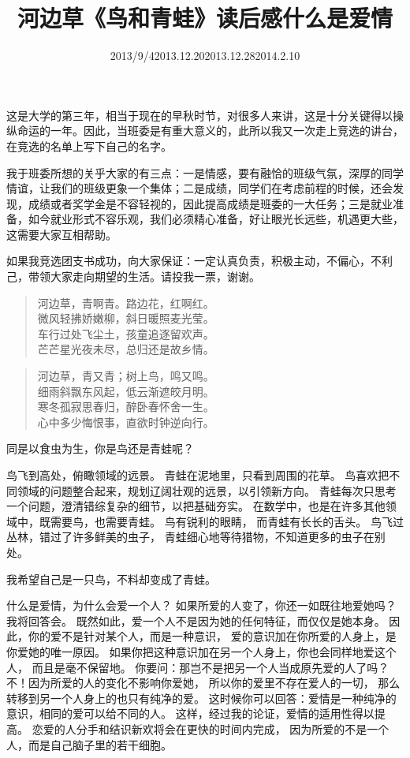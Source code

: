 \documentclass{article}
\begin{document}
这是大学的第三年，相当于现在的早秋时节，对很多人来讲，这是十分关键得以操纵命运的一年。因此，当班委是有重大意义的，此所以我又一次走上竞选的讲台，在竞选的名单上写下自己的名字。

我于班委所想的关乎大家的有三点：一是情感，要有融恰的班级气氛，深厚的同学情谊，让我们的班级更象一个集体；二是成绩，同学们在考虑前程的时候，还会发现，成绩或者奖学金是不容轻视的，因此提高成绩是班委的一大任务；三是就业准备，如今就业形式不容乐观，我们必须精心准备，好让眼光长远些，机遇更大些，这需要大家互相帮助。

如果我竞选团支书成功，向大家保证：一定认真负责，积极主动，不偏心，不利己，带领大家走向期望的生活。请投我一票，谢谢。
\date{2013/9/4}


\title{河边草}
\begin{verse}
河边草，青啊青。路边花，红啊红。\\
微风轻拂娇嫩柳，斜日暖照麦光莹。\\
车行过处飞尘土，孩童追逐留欢声。\\
芒芒星光夜未尽，总归还是故乡情。\\
\end{verse}\begin{verse}
河边草，青又青；树上鸟，鸣又鸣。\\
细雨斜飘东风起，低云渐遮皎月明。\\
寒冬孤寂思春归，醉卧春怀舍一生。\\
心中多少悔恨事，直欲时钟逆向行。\\
\end{verse}\date{2013.12.20}

\title{《鸟和青蛙》读后感}
同是以食虫为生，你是鸟还是青蛙呢？

 鸟飞到高处，俯瞰领域的远景。
 青蛙在泥地里，只看到周围的花草。
鸟喜欢把不同领域的问题整合起来，规划辽阔壮观的远景，以引领新方向。
青蛙每次只思考一个问题，澄清错综复杂的细节，以把基础夯实。
在数学中，也是在许多其他领域中，既需要鸟，也需要青蛙。
鸟有锐利的眼睛，
而青蛙有长长的舌头。
鸟飞过丛林，错过了许多鲜美的虫子，
青蛙细心地等待猎物，不知道更多的虫子在别处。

我希望自己是一只鸟，不料却变成了青蛙。
\date{2013.12.28}

\title{什么是爱情}
什么是爱情，为什么会爱一个人？
如果所爱的人变了，你还一如既往地爱她吗？
我将回答会。
既然如此，爱一个人不是因为她的任何特征，而仅仅是她本身。
因此，你的爱不是针对某个人，而是一种意识，
爱的意识加在你所爱的人身上，是你爱她的唯一原因。
如果你把这种意识加在另一个人身上，你也会同样地爱这个人，
而且是毫不保留地。
你要问：那岂不是把另一个人当成原先爱的人了吗？
不！因为所爱的人的变化不影响你爱她，
所以你的爱里不存在爱人的一切，
那么转移到另一个人身上的也只有纯净的爱。
这时候你可以回答：爱情是一种纯净的意识，相同的爱可以给不同的人。
这样，经过我的论证，爱情的适用性得以提高。
恋爱的人分手和结识新欢将会在更快的时间内完成，
因为所爱的不是一个人，而是自己脑子里的若干细胞。
\date{2014.2.10} 
\end{document}
